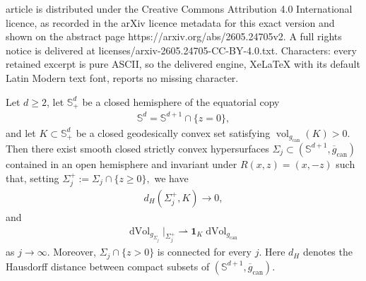 \documentclass[10pt,a4paper]{amsart}
\def\bS {\mathbb{S}}
\newcommand{\can}{\mathrm{can}}
\newcommand{\dvol}{\operatorname{dVol}}
\newcommand{\vol}{\operatorname{vol}}
\newcommand{\wto}{\rightharpoonup}
\begin{document}
article is distributed under the Creative Commons Attribution 4.0 International licence, as recorded in the arXiv licence metadata for this exact version and shown on the abstract page https://arxiv.org/abs/2605.24705v2. A full rights notice is delivered at licenses/arxiv-2605.24705-CC-BY-4.0.txt. Characters: every retained excerpt is pure ASCII, so the delivered engine, XeLaTeX with its default Latin Modern text font, reports no missing character.
\begin{lem}\label{lem:hemisphere-pancake-approximation}
Let $d\geq2$, let $\bS^d_+$ be a closed hemisphere of the equatorial copy
\begin{align}
        \bS^d
        =
        \bS^{d+1}\cap\{z=0\},
\end{align}
and let $K\subset\bS^d_+$ be a closed geodesically convex set satisfying $ \vol_{g_{\can}}(K)>0.$ Then there exist smooth closed strictly convex hypersurfaces $\Sigma_j \subset (\bS^{d+1},\overline g_{\can})$ contained in an open hemisphere and invariant under $R(x,z)=(x,-z)$ such that, setting $ \Sigma_j^+:=\Sigma_j\cap\{z\geq0\},$ we have
\begin{align}\label{eq:hemisphere-pancake-Hausdorff-limit}
        d_H(\Sigma_j^+,K)
        \rightarrow
        0,
\end{align}
and
\begin{align}\label{eq:hemisphere-pancake-measure-limit}
        \dvol_{g_{\Sigma_j}}|_{\Sigma_j^+}
        \wto
        \mathbf{1}_K\dvol_{g_{\can}}
\end{align}
as $j\to \infty$. Moreover, $ \Sigma_j\cap\{z>0\}$ is connected for every $j$. Here $d_H$ denotes the Hausdorff distance between compact subsets of $(\bS^{d+1},\overline g_{\can})$.
\end{lem}
\end{document}
